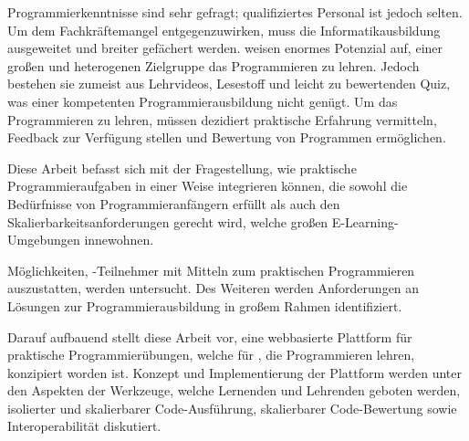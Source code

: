 Programmierkenntnisse sind sehr gefragt; qualifiziertes Personal ist jedoch selten. Um dem Fachkräftemangel entgegenzuwirken, muss die Informatikausbildung ausgeweitet und breiter gefächert werden.  weisen enormes Potenzial auf, einer großen und heterogenen Zielgruppe das Programmieren zu lehren. Jedoch bestehen sie zumeist aus Lehrvideos, Lesestoff und leicht zu bewertenden Quiz, was einer kompetenten Programmierausbildung nicht genügt. Um das Programmieren zu lehren, müssen  dezidiert praktische Erfahrung vermitteln, Feedback zur Verfügung stellen und Bewertung von Programmen ermöglichen.

Diese Arbeit befasst sich mit der Fragestellung, wie  praktische Programmieraufgaben in einer Weise integrieren können, die sowohl die Bedürfnisse von Programmieranfängern erfüllt als auch den Skalierbarkeitsanforderungen gerecht wird, welche großen E-Learning-Umgebungen innewohnen.

Möglichkeiten, -Teilnehmer mit Mitteln zum praktischen Programmieren auszustatten, werden untersucht. Des Weiteren werden Anforderungen an Lösungen zur Programmierausbildung in großem Rahmen identifiziert.

Darauf aufbauend stellt diese Arbeit \tool vor, eine webbasierte Plattform für praktische Programmierübungen, welche für , die Programmieren lehren, konzipiert worden ist. Konzept und Implementierung der Plattform werden unter den Aspekten der Werkzeuge, welche Lernenden und Lehrenden geboten werden, isolierter und skalierbarer Code-Ausführung, skalierbarer Code-Bewertung sowie Interoperabilität diskutiert.
